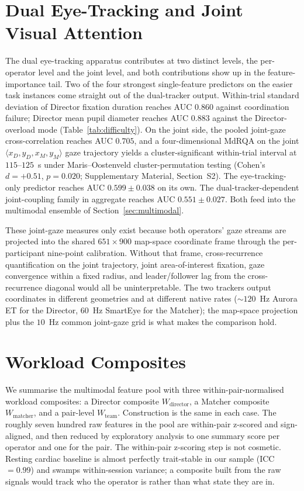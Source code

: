 \section{Dual Eye-Tracking and Joint Visual Attention}\label{sec:dualet}
The dual eye-tracking apparatus contributes at two distinct levels, the per-operator level and the joint level, and both contributions show up in the feature-importance tail. Two of the four strongest single-feature predictors on the easier task instances come straight out of the dual-tracker output. Within-trial standard deviation of Director fixation duration reaches AUC $0.860$ against coordination failure; Director mean pupil diameter reaches AUC $0.883$ against the Director-overload mode (Table~\ref{tab:difficulty}). On the joint side, the pooled joint-gaze cross-correlation reaches AUC $0.705$, and a four-dimensional MdRQA on the joint $\langle x_D, y_D, x_M, y_M\rangle$ gaze trajectory yields a cluster-significant within-trial interval at $115$--$125$~s under Maris--Oostenveld cluster-permutation testing (Cohen's $d = +0.51$, $p = 0.020$; Supplementary Material, Section~S2). The eye-tracking-only predictor reaches AUC $0.599 \pm 0.038$ on its own. The dual-tracker-dependent joint-coupling family in aggregate reaches AUC $0.551 \pm 0.027$. Both feed into the multimodal ensemble of Section~\ref{sec:multimodal}.

These joint-gaze measures only exist because both operators' gaze streams are projected into the shared $651 \times 900$ map-space coordinate frame through the per-participant nine-point calibration. Without that frame, cross-recurrence quantification on the joint trajectory, joint area-of-interest fixation, gaze convergence within a fixed radius, and leader/follower lag from the cross-recurrence diagonal would all be uninterpretable. The two trackers output coordinates in different geometries and at different native rates ($\sim$$120$~Hz Aurora ET for the Director, $60$~Hz SmartEye for the Matcher); the map-space projection plus the $10$~Hz common joint-gaze grid is what makes the comparison hold.

\section{Workload Composites}\label{sec:workload}
We summarise the multimodal feature pool with three within-pair-normalised workload composites: a Director composite $W_{\text{director}}$, a Matcher composite $W_{\text{matcher}}$, and a pair-level $W_{\text{team}}$. Construction is the same in each case. The roughly seven hundred raw features in the pool are within-pair z-scored and sign-aligned, and then reduced by exploratory analysis to one summary score per operator and one for the pair. The within-pair z-scoring step is not cosmetic. Resting cardiac baseline is almost perfectly trait-stable in our sample (ICC $= 0.99$) and swamps within-session variance; a composite built from the raw signals would track who the operator is rather than what state they are in.

